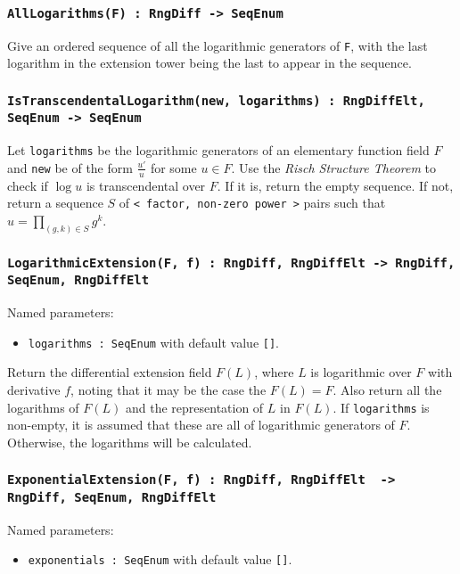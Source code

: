 \documentclass{article}
\theoremstyle{plain}
\theoremstyle{definition}
\begin{document}
\subsubsection*{\lstinline{AllLogarithms(F) : RngDiff -> SeqEnum}}
Give an ordered sequence of all the logarithmic generators of \lstinline{F},
with the last logarithm in the extension tower being the last to appear in the
sequence.

\subsubsection*{\lstinline{IsTranscendentalLogarithm(new, logarithms) : RngDiffElt, SeqEnum -> SeqEnum}}
Let \lstinline{logarithms} be the logarithmic generators of an elementary
function field $F$ and \lstinline{new} be of the form $\frac {u'} u$ for some
$u \in F$. Use the \emph{Risch Structure Theorem} to check if $\log u$ is
transcendental over $F$. If it is, return the empty sequence. If not, return a
sequence $S$ of \lstinline{< factor, non-zero power >} pairs such that $u =
\prod_{(g, k) \in S} g^k$.

\subsubsection*{\lstinline{LogarithmicExtension(F, f) : RngDiff, RngDiffElt -> RngDiff, SeqEnum, RngDiffElt}}

Named parameters:
\begin{itemize}
    \item[] \lstinline{logarithms : SeqEnum} with default value \lstinline{[]}.
\end{itemize}

\noindent Return the differential extension field $F(L)$, where $L$ is
logarithmic over $F$ with derivative $f$, noting that it may be the case the
$F(L) = F$. Also return all the logarithms of $F(L)$ and the representation
of $L$ in $F(L)$. If \lstinline{logarithms} is non-empty, it is assumed
that these are all of logarithmic generators of $F$. Otherwise, the
logarithms will be calculated.

\subsubsection*{\lstinline{ExponentialExtension(F, f) : RngDiff, RngDiffElt  -> RngDiff, SeqEnum, RngDiffElt}}

Named parameters:
\begin{itemize}
    \item[] \lstinline{exponentials : SeqEnum} with default value \lstinline{[]}.
\end{itemize}
\end{document}
